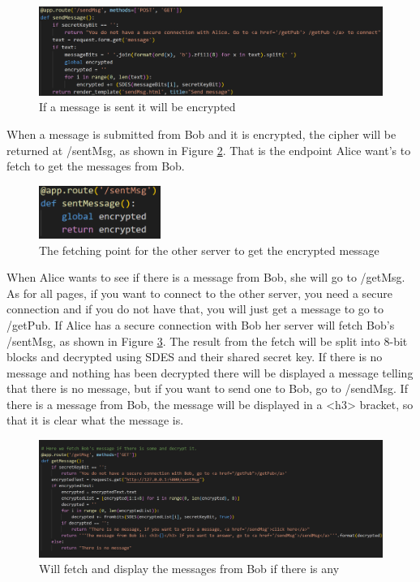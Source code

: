 \documentclass[12pt, letterpaper]{article}
\begin{document}
\begin{figure}[H]
  \hspace*{-50px}\includegraphics[width=500px]{code_snippets/sendMsg.PNG}
  \caption{If a message is sent it will be encrypted}
  \label{fig:sendMsg}
\end{figure}

When a message is submitted from Bob and it is encrypted, the cipher will be returned at /sentMsg, as shown in Figure \ref{fig:sentMsg}. That is the endpoint Alice want's to fetch to get the messages from Bob.

\begin{figure}[H]
  \includegraphics[width=150px]{code_snippets/sentMsg.PNG}\centering
  \caption{The fetching point for the other server to get the encrypted message}
  \label{fig:sentMsg}
\end{figure}

When Alice wants to see if there is a message from Bob, she will go to /getMsg. As for all pages, if you want to connect to the other server, you need a secure connection and if you do not have that, you will just get a message to go to /getPub. If Alice has a secure connection with Bob her server will fetch Bob's /sentMsg, as shown in Figure \ref{fig:getMsg}. The result from the fetch will be split into 8-bit blocks and decrypted using SDES and their shared secret key. If there is no message and nothing has been decrypted there will be displayed a message telling that there is no message, but if you want to send one to Bob, go to /sendMsg. If there is a message from Bob, the message will be displayed in a <h3> bracket, so that it is clear what the message is. 

\begin{figure}[H]
  \hspace*{-50px}\includegraphics[width=500px]{code_snippets/getMsg.PNG}
  \caption{Will fetch and display the messages from Bob if there is any}
  \label{fig:getMsg}
\end{figure}
\end{document}

